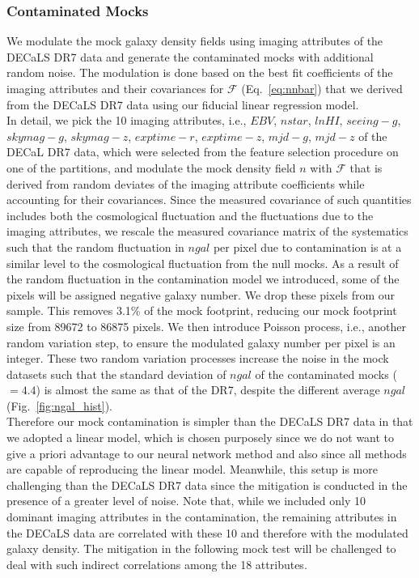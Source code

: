 \documentclass[fleqn, usenatbib]{mnras}
\begin{document}
\subsubsection{Contaminated Mocks}
We modulate the mock galaxy density fields using imaging attributes of the DECaLS DR7 data and generate the contaminated mocks with additional random noise. The modulation is done based on the best fit coefficients of the imaging attributes and their covariances for $\mathcal{F}$ (Eq.~\ref{eq:nnbar}) that we derived from the DECaLS DR7 data using our fiducial linear regression model.\\

In detail, we pick the 10 imaging attributes, i.e., $EBV$, $nstar$, $lnHI$, $seeing-g$, $skymag-g$, $skymag-z$, $exptime-r$, $exptime-z$, $mjd-g$, $mjd-z$ of the DECaL DR7 data, which were selected from the feature selection procedure on one of the partitions, and modulate the mock density field $n$ with $\mathcal{F}$ that is derived from random deviates of the imaging attribute coefficients while accounting for their covariances. Since the measured covariance of such quantities includes both the cosmological fluctuation and the fluctuations due to the imaging attributes, we rescale the measured covariance matrix of the systematics such that the random fluctuation in $ngal$ per pixel due to contamination is at a similar level to the cosmological fluctuation from the null mocks. As a result of the random fluctuation in the contamination model we introduced, some of the pixels will be assigned negative galaxy number. We drop these pixels from our sample. This removes 3.1\% of the mock footprint, reducing our mock footprint size from 89672 to 86875 pixels. We then introduce Poisson process, i.e., another random variation step, to ensure the modulated galaxy number per pixel is an integer. These two random variation processes increase the noise in the mock datasets such that the standard deviation of $ngal$ of the contaminated mocks ($=4.4$) is almost the same as that of the DR7, despite the different average $ngal$ (Fig.~\ref{fig:ngal_hist}).\\


Therefore our mock contamination is simpler than the DECaLS DR7 data in that we adopted a linear model, which is chosen purposely since we do not want to give a priori advantage to our neural network method and also since all methods are capable of reproducing the linear model. Meanwhile, this setup is more challenging than the DECaLS DR7 data since the mitigation is conducted in the presence of a greater level of noise. Note that, while we included only 10 dominant imaging attributes in the contamination, the remaining attributes in the DECaLS data are correlated with these 10 and therefore with the modulated galaxy density. The mitigation in the following mock test will be challenged to deal with such indirect correlations among the 18 attributes. 
\end{document}
